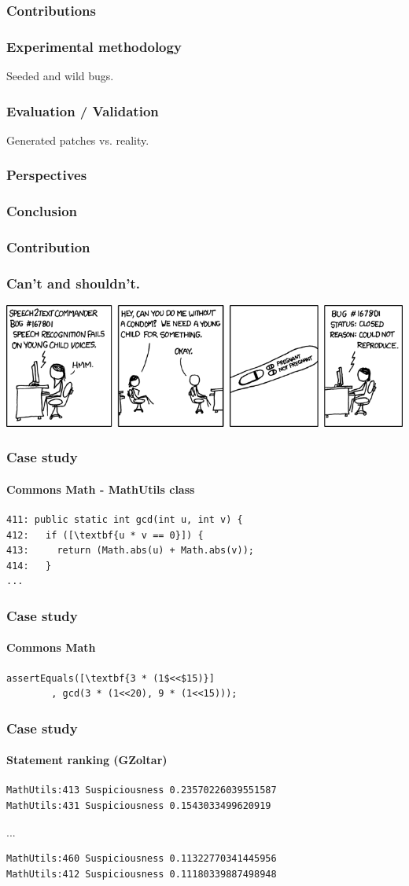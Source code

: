 \documentclass{beamer}
\begin{document}
  \frame
  {
    \frametitle{Contributions}
  }


  \frame
  {
    \frametitle{Experimental methodology}
    Seeded and wild bugs.
  }
  
  \frame
  {
    \frametitle{Evaluation / Validation}
    Generated patches vs. reality.
  }
  
  \frame
  {
    \frametitle{Perspectives}
    
  }
  
  \frame
  {
    \frametitle{Conclusion}
    
  }

  \frame
  {
    \frametitle{Contribution}
    
  }
  
 \frame
  {
    \frametitle{Can't and shouldn't.}
\includegraphics[width=.8\paperwidth]{cnr}

}



 \begin{frame}[fragile]
    \frametitle{Case study}
      \framesubtitle{Commons Math - MathUtils class}
\begin{lstlisting}[escapeinside=\[\]]
411: public static int gcd(int u, int v) {
412:   if ([\textbf{u * v == 0}]) {
413:     return (Math.abs(u) + Math.abs(v));
414:   }
...
\end{lstlisting}
\end{frame}

 \begin{frame}[fragile]
    \frametitle{Case study}
      \framesubtitle{Commons Math}
        \begin{lstlisting}[escapeinside=\[\]]
assertEquals([\textbf{3 * (1$<<$15)}]
        , gcd(3 * (1<<20), 9 * (1<<15)));
	\end{lstlisting}
\end{frame}

 \begin{frame}[fragile]
    \frametitle{Case study}
      \framesubtitle{Statement ranking (GZoltar)}
\begin{verbatim}
MathUtils:413 Suspiciousness 0.23570226039551587
MathUtils:431 Suspiciousness 0.1543033499620919
\end{verbatim}
...
\begin{verbatim}
MathUtils:460 Suspiciousness 0.11322770341445956
MathUtils:412 Suspiciousness 0.11180339887498948
\end{verbatim}
\end{frame}
\end{document}
